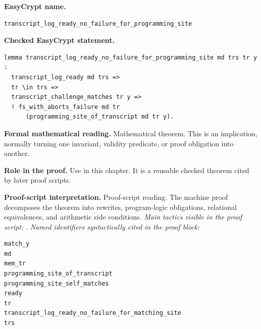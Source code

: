 \begin{formaltheorem}
\noindent\textbf{EasyCrypt name.}
\begin{lstlisting}[language=EasyCrypt,basicstyle=\ttfamily\scriptsize]
transcript_log_ready_no_failure_for_programming_site
\end{lstlisting}
\noindent\textbf{Checked EasyCrypt statement.}
\begin{lstlisting}[language=EasyCrypt,basicstyle=\ttfamily\scriptsize]
lemma transcript_log_ready_no_failure_for_programming_site md trs tr y :
  transcript_log_ready md trs =>
  tr \in trs =>
  transcript_challenge_matches tr y =>
  ! fs_with_aborts_failure md tr
      (programming_site_of_transcript md tr y).
\end{lstlisting}
\noindent\textbf{Formal mathematical reading.}
Mathematical theorem. This is an implication, normally turning one invariant, validity predicate, or proof obligation into another.

\noindent\textbf{Role in the proof.}
Use in this chapter. It is a reusable checked theorem cited by later proof scripts.

\noindent\textbf{Proof-script interpretation.}
Proof-script reading. The machine proof decomposes the theorem into rewrites, program-logic obligations, relational equivalences, and arithmetic side conditions.
\emph{Main tactics visible in the proof script:} .
\emph{Named identifiers syntactically cited in the proof block:}
\begin{lstlisting}[language=EasyCrypt,basicstyle=\ttfamily\scriptsize]
match_y
md
mem_tr
programming_site_of_transcript
programming_site_self_matches
ready
tr
transcript_log_ready_no_failure_for_matching_site
trs
\end{lstlisting}

\end{formaltheorem}

